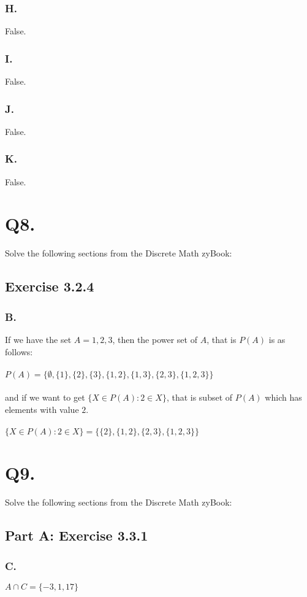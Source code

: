 \documentclass[titlepage]{article}\pagestyle{empty}
\begin{document}
\subsubsection*{H.} False.
\subsubsection*{I.} False.
\subsubsection*{J.} False.
\subsubsection*{K.} False.

\pagebreak
\section*{Q8.} Solve the following sections from the Discrete Math zyBook:
\subsection*{Exercise 3.2.4}
\subsubsection*{B.}
If we have the set $A = {1, 2, 3}$, then the power set of $A$, that is $P(A)$ is as follows:\\~\\
$P(A)=\{ \emptyset, \{1\}, \{2\}, \{3\}, \{1, 2\}, \{1, 3\}, \{2, 3\}, \{1, 2, 3\}\}$ \\~\\
and if we want to get $\{X \in P(A): 2 \in X\}$, that is subset of $P(A)$ which has elements with value $2$.\\~\\
$\{X \in P(A): 2 \in X\}=\{\{2\}, \{1, 2\}, \{2, 3\}, \{1, 2, 3\}\}$

\pagebreak
\section*{Q9.} Solve the following sections from the Discrete Math zyBook:
\subsection*{Part A: Exercise 3.3.1}
\subsubsection*{C.} $A \cap C = \{-3, 1, 17\}$
\end{document}
